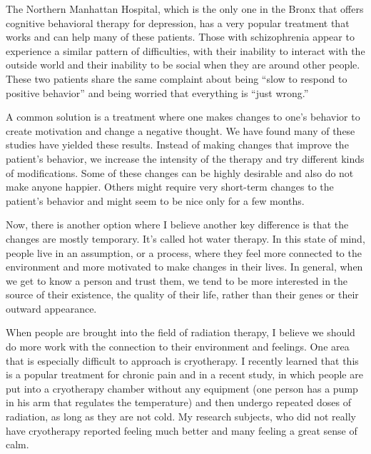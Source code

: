 \documentclass{article}
\begin{document}
The Northern Manhattan Hospital, which is the only one in the Bronx that offers cognitive behavioral therapy for depression, has a very popular treatment that works and can help many of these patients. Those with schizophrenia appear to experience a similar pattern of difficulties, with their inability to interact with the outside world and their inability to be social when they are around other people. These two patients share the same complaint about being “slow to respond to positive behavior” and being worried that everything is “just wrong.”

A common solution is a treatment where one makes changes to one’s behavior to create motivation and change a negative thought. We have found many of these studies have yielded these results. Instead of making changes that improve the patient’s behavior, we increase the intensity of the therapy and try different kinds of modifications. Some of these changes can be highly desirable and also do not make anyone happier. Others might require very short-term changes to the patient’s behavior and might seem to be nice only for a few months.

Now, there is another option where I believe another key difference is that the changes are mostly temporary. It’s called hot water therapy. In this state of mind, people live in an assumption, or a process, where they feel more connected to the environment and more motivated to make changes in their lives. In general, when we get to know a person and trust them, we tend to be more interested in the source of their existence, the quality of their life, rather than their genes or their outward appearance.

When people are brought into the field of radiation therapy, I believe we should do more work with the connection to their environment and feelings. One area that is especially difficult to approach is cryotherapy. I recently learned that this is a popular treatment for chronic pain and in a recent study, in which people are put into a cryotherapy chamber without any equipment (one person has a pump in his arm that regulates the temperature) and then undergo repeated doses of radiation, as long as they are not cold. My research subjects, who did not really have cryotherapy reported feeling much better and many feeling a great sense of calm.
\end{document}
